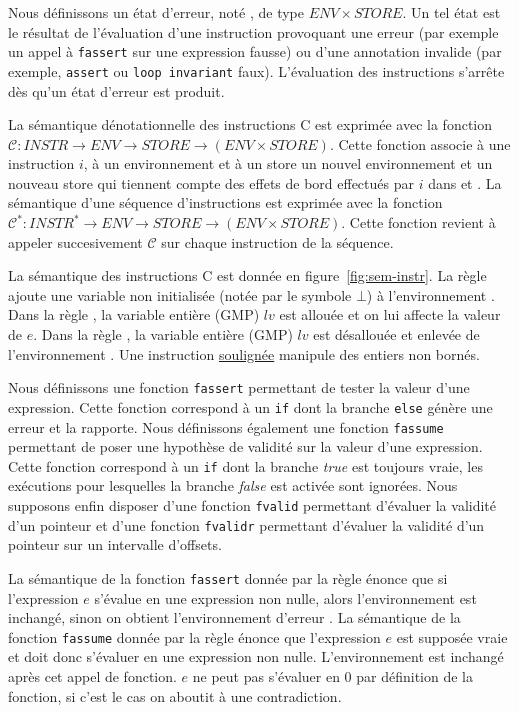 Nous définissons un état d'erreur, noté \errorenv, de type $ENV \times STORE$.
Un tel état est le résultat de l'évaluation d'une instruction
provoquant une erreur (par exemple un appel à \lstinline'fassert' sur une
expression fausse) ou d'une annotation invalide (par exemple,
\lstinline'assert' ou \lstinline'loop invariant' faux).
L'évaluation des instructions s'arrête dès qu'un état d'erreur est produit.

La sémantique dénotationnelle des instructions C est exprimée avec la fonction
$\mathcal{C} : INSTR \rightarrow ENV \rightarrow STORE \rightarrow (ENV \times STORE)$.
Cette fonction associe à une instruction $i$, à un environnement \env{} et à un
store \store{} un nouvel environnement et un nouveau store qui tiennent compte
des effets de bord effectués par $i$ dans \env{} et \store{}.
La sémantique d'une séquence d'instructions est exprimée avec la fonction
$\mathcal{C}^{*} : INSTR^{*} \rightarrow ENV \rightarrow STORE \rightarrow (ENV \times STORE)$.
Cette fonction revient à appeler succesivement $\mathcal{C}$ sur chaque
instruction de la séquence.




La sémantique des instructions C est donnée en figure~\ref{fig:sem-instr}.
La règle  ajoute une variable non initialisée (notée par le
symbole $\bot$) à l'environnement \env.
Dans la règle , la variable entière (GMP) $\mathit{lv}$ est
allouée et on lui affecte la valeur de $e$.
Dans la règle , la variable entière (GMP) $\mathit{lv}$
est désallouée et enlevée de l'environnement \env.
Une instruction \underline{soulignée} manipule des entiers non bornés.

Nous définissons une fonction \lstinline'fassert' permettant de tester la valeur
d'une expression.
Cette fonction correspond à un \lstinline'if' dont la branche
\lstinline'else' génère une erreur et la rapporte.
Nous définissons également une fonction \lstinline'fassume' permettant de poser
une hypothèse de validité sur la valeur d'une expression.
Cette fonction correspond à un \lstinline'if' dont
la branche \textit{true} est toujours vraie, les exécutions pour lesquelles
la branche \textit{false} est activée sont ignorées.
Nous supposons enfin disposer d'une fonction \lstinline'fvalid' permettant
d'évaluer la validité d'un pointeur et d'une fonction \lstinline'fvalidr'
permettant d'évaluer la validité d'un pointeur sur un intervalle d'offsets.

La sémantique de la fonction \lstinline'fassert' donnée par la règle
 énonce que si l'expression $e$ s'évalue en une
expression non nulle, alors l'environnement \env est inchangé, sinon on obtient
l'environnement d'erreur \errorenv.
La sémantique de la fonction \lstinline'fassume' donnée par la règle
 énonce que l'expression $e$ est supposée vraie et
doit donc s'évaluer en une expression non nulle.
L'environnement est inchangé après cet appel de fonction.
$e$ ne peut pas s'évaluer en $0$ par définition de la fonction, si c'est
le cas on aboutit à une contradiction.

